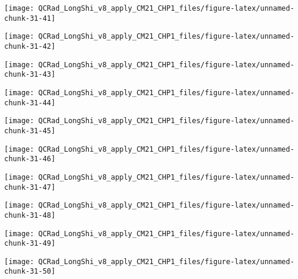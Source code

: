 \documentclass[
  10pt,
  a4paper,oneside]{article}
\begin{document}
\begin{center}\texttt{[image: QCRad\_LongShi\_v8\_apply\_CM21\_CHP1\_files/figure-latex/unnamed-chunk-31-41]} \end{center}

\begin{center}\texttt{[image: QCRad\_LongShi\_v8\_apply\_CM21\_CHP1\_files/figure-latex/unnamed-chunk-31-42]} \end{center}

\begin{center}\texttt{[image: QCRad\_LongShi\_v8\_apply\_CM21\_CHP1\_files/figure-latex/unnamed-chunk-31-43]} \end{center}

\begin{center}\texttt{[image: QCRad\_LongShi\_v8\_apply\_CM21\_CHP1\_files/figure-latex/unnamed-chunk-31-44]} \end{center}

\begin{center}\texttt{[image: QCRad\_LongShi\_v8\_apply\_CM21\_CHP1\_files/figure-latex/unnamed-chunk-31-45]} \end{center}

\begin{center}\texttt{[image: QCRad\_LongShi\_v8\_apply\_CM21\_CHP1\_files/figure-latex/unnamed-chunk-31-46]} \end{center}

\begin{center}\texttt{[image: QCRad\_LongShi\_v8\_apply\_CM21\_CHP1\_files/figure-latex/unnamed-chunk-31-47]} \end{center}

\begin{center}\texttt{[image: QCRad\_LongShi\_v8\_apply\_CM21\_CHP1\_files/figure-latex/unnamed-chunk-31-48]} \end{center}

\begin{center}\texttt{[image: QCRad\_LongShi\_v8\_apply\_CM21\_CHP1\_files/figure-latex/unnamed-chunk-31-49]} \end{center}

\begin{center}\texttt{[image: QCRad\_LongShi\_v8\_apply\_CM21\_CHP1\_files/figure-latex/unnamed-chunk-31-50]} \end{center}
\end{document}
